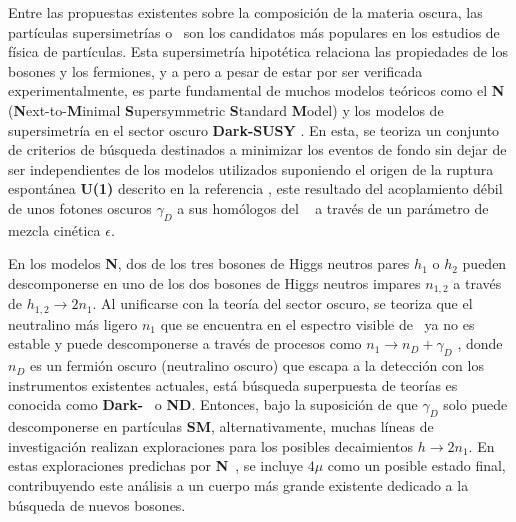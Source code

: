 Entre las propuestas existentes sobre la composición de la materia oscura, las partículas supersimetrías o \SUSY ~son los candidatos más populares en los estudios de física de partículas. Esta supersimetría hipotética relaciona las propiedades de los bosones y los fermiones, y a pero a pesar de estar por ser verificada experimentalmente, es parte fundamental de muchos modelos teóricos como el \textbf{N}\MSSM ~ (\textbf{N}ext-to-\textbf{M}inimal \textbf{S}upersymmetric \textbf{S}tandard \textbf{M}odel) \citep{MSSM_1, MSSM_2} y los modelos de supersimetría en el sector oscuro \textbf{Dark-SUSY} \citep{LB}. En esta, se teoriza un conjunto de criterios de búsqueda destinados a minimizar los eventos de fondo sin dejar de ser independientes de los modelos utilizados suponiendo el origen de la ruptura espontánea \textbf{U(1)} descrito en la referencia \cite{dark_1, dark_2}, este resultado del acoplamiento débil de unos fotones oscuros $\gamma_D$ a sus homólogos del \ME ~ a través de un parámetro de mezcla cinética $\epsilon$. %


En los modelos \textbf{N}\MSSM, dos de los tres bosones de Higgs neutros pares $h_1$ o $h_2$ pueden descomponerse en uno de los dos bosones de Higgs neutros impares $n_{1,2}$ a través de $h_{1,2} \rightarrow  2n_1$. Al unificarse con la teoría del sector oscuro, se teoriza que el neutralino más ligero $n_1$ que se encuentra en el espectro visible de \SUSY ~ya no es estable y puede descomponerse a través de procesos como $n_1  \rightarrow n_D + \gamma_D$ , donde $n_D$ es un fermión oscuro (neutralino oscuro) que escapa a la detección con los instrumentos existentes actuales, está búsqueda superpuesta de teorías es conocida como \textbf{Dark-}\SUSY~ o \textbf{N}\MSSM\textbf{D}. Entonces, bajo la suposición de que $\gamma_D$ solo puede descomponerse en partículas \textbf{SM}, alternativamente, muchas líneas de investigación realizan exploraciones para los posibles decaimientos $h \rightarrow 2n_1$. En estas exploraciones predichas por \textbf{N}\MSSM ~, se incluye $4\mu$ \citep{cms_collaboration_search_2016,cms_collaboration_search_2013} como un posible estado final, contribuyendo este análisis a un cuerpo más grande existente dedicado a la búsqueda de nuevos bosones.

